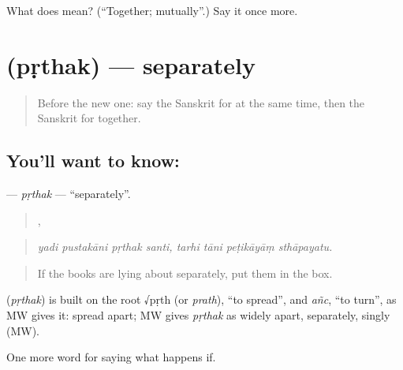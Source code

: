 \begin{tcolorbox}[breakable,colback=teal!4,colframe=teal!35!black,title={Before you move on}]
What does  mean? (\textquotedblleft{}Together; mutually\textquotedblright{}.) Say it once more.
\end{tcolorbox}
\section[\texorpdfstring{\sk{पृथक्} (pṛthak)}{पृथक् (pṛthak)}]{ (pṛthak) — separately}

\label{lesson:SA-C544-prthak}



\begin{quote}
Before the new one: say the Sanskrit for at the same time, then the Sanskrit for together.
\end{quote}

\subsection*{You'll want to know: }
\textbf{} — \emph{pṛthak} — \textquotedblleft{}separately\textquotedblright{}.

\begin{quote}
   ,    
\end{quote}

\begin{quote}
\emph{yadi pustakāni pṛthak santi, tarhi tāni peṭikāyāṃ sthāpayatu.}
\end{quote}

\begin{quote}
If the books are lying about separately, put them in the box.
\end{quote}

\begin{cousinweb}
\textbf{} (\emph{pṛthak}) is built on the root √pṛth (or \emph{prath}), \textquotedblleft{}to spread\textquotedblright{}, and \emph{añc}, \textquotedblleft{}to turn\textquotedblright{}, as MW gives it: spread apart; MW gives \emph{pṛthak} as widely apart, separately, singly (MW).
\end{cousinweb}

\begin{grammarlens}[title={What you've built}]
One more word for saying what happens if.
\end{grammarlens}

